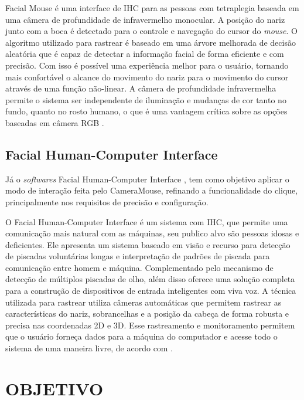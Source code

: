 Facial Mouse é uma interface de IHC para as pessoas com tetraplegia baseada em uma câmera de profundidade de infravermelho monocular. A posição do nariz junto com a boca é detectado para o controle e navegação do cursor do \textit{mouse}. O algoritmo utilizado para rastrear é baseado em uma árvore melhorada de decisão aleatória que é capaz de detectar a informação facial de forma eficiente e com precisão. Com isso é possível uma experiência melhor para o usuário, tornando mais confortável o alcance do movimento do nariz para o movimento do cursor através de uma função não-linear. A câmera de profundidade infravermelha permite o sistema ser independente de iluminação e mudanças de cor tanto no fundo, quanto no rosto humano, o que é uma vantagem crítica sobre as opções baseadas em câmera RGB .

\subsection{Facial Human-Computer Interface}

Já o \textit{softwares} Facial Human-Computer Interface , tem como objetivo aplicar o modo de interação feita pelo CameraMouse, refinando a funcionalidade do clique, principalmente nos requisitos de precisão e configuração.

O Facial Human-Computer Interface é um sistema com IHC, que permite uma comunicação mais natural com as máquinas, seu publico alvo são pessoas idosas e deficientes. Ele apresenta um sistema baseado em visão e recurso para detecção de piscadas voluntárias longas e interpretação de padrões de piscada para comunicação entre homem e máquina. Complementado pelo mecanismo de detecção de múltiplos piscadas de olho, além disso oferece uma solução completa para a construção de dispositivos de entrada inteligentes com viva voz. A técnica utilizada para rastrear utiliza câmeras automáticas que permitem rastrear as características do nariz, sobrancelhas e a posição da cabeça de forma robusta e precisa nas coordenadas 2D e 3D. Esse rastreamento e monitoramento permitem que o usuário forneça dados para a máquina do computador e acesse todo o sistema de uma maneira livre, de acordo com . 


\section{OBJETIVO}\label{sub:objeto}


